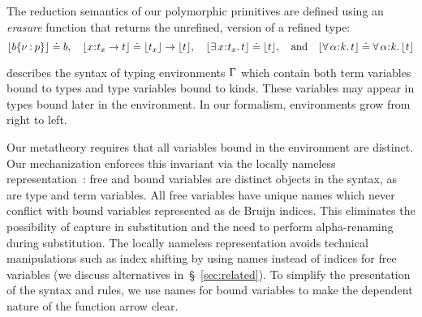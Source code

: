 %
The reduction semantics of our polymorphic 
primitives are defined 
using an \emph{erasure} function that 
returns the unrefined, \sysf version of a refined \sysrf type:
\[
  \lfloor{ {\ensuremath{{b}\{\nu \mathbin{:} p\}}} }\rfloor \doteq b, \quad 
  \lfloor{ x\hspace{0.05em}{:}\hspace{0.05em}t_x \rightarrow t }\rfloor \doteq \lfloor{t_x}\rfloor \rightarrow \lfloor{t}\rfloor, \quad
  \lfloor{ \exists\, x\hspace{0.05em}{:}\hspace{0.05em}t_x.\, t }\rfloor \doteq \lfloor{t}\rfloor, \quad{\rm and} \quad
  \lfloor{ \forall\, \alpha\hspace{0.05em}{:}\hspace{0.05em}k.\, t }\rfloor \doteq \forall\, \alpha\hspace{0.05em}{:}\hspace{0.05em} k.\, \lfloor{t}\rfloor
\]


%
 describes 
the syntax of typing environments 
$\mathrm{\Gamma}$ which contain both term 
variables bound to types and type 
variables bound to kinds. 
%
These variables may appear in types 
bound later in the environment.
%
In our formalism, environments grow 
from right to left.
%

Our metatheory requires that all variables 
bound in the environment are distinct. 
%
Our mechanization enforces this invariant 
via the locally nameless representation~\cite{Aydemir05}: 
free and bound variables are distinct objects 
in the syntax, as are type and term variables.
%
All free variables have unique names which
never conflict with bound variables represented as 
de Bruijn indices. This eliminates
the possibility of capture in substitution
and the need to perform alpha-renaming during
substitution. 
The locally nameless representation avoids %
technical manipulations such as index shifting by using 
names instead of indices for  free variables 
(we discuss alternatives in~\S~\ref{sec:related}).
%
To simplify the presentation of the syntax and rules, we 
use names for bound variables to make the dependent nature
of the function arrow clear.

